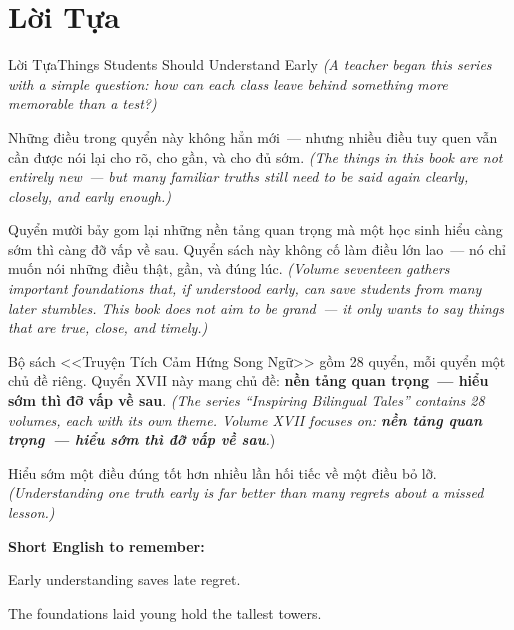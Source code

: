 \chapter*{Lời Tựa}

\begin{truyen}{Lời Tựa}{Things Students Should Understand Early}
\textit{(A teacher began this series with a simple question: how can each class leave behind something more memorable than a test?)}

Những điều trong quyển này không hẳn mới~--- nhưng nhiều điều tuy quen vẫn cần được nói lại cho rõ, cho gần, và cho đủ sớm.
\textit{(The things in this book are not entirely new~--- but many familiar truths still need to be said again clearly, closely, and early enough.)}

Quyển mười bảy gom lại những nền tảng quan trọng mà một học sinh hiểu càng sớm thì càng đỡ vấp về sau. Quyển sách này không cố làm điều lớn lao~--- nó chỉ muốn nói những điều thật, gần, và đúng lúc.
\textit{(Volume seventeen gathers important foundations that, if understood early, can save students from many later stumbles. This book does not aim to be grand~--- it only wants to say things that are true, close, and timely.)}

Bộ sách <<Truyện Tích Cảm Hứng Song Ngữ>> gồm 28 quyển, mỗi quyển một chủ đề riêng. Quyển XVII này mang chủ đề: \textbf{nền tảng quan trọng~--- hiểu sớm thì đỡ vấp về sau}.
\textit{(The series ``Inspiring Bilingual Tales'' contains 28 volumes, each with its own theme. Volume XVII focuses on: \textbf{nền tảng quan trọng~--- hiểu sớm thì đỡ vấp về sau}.})
\end{truyen}

\begin{baihoc}
Hiểu sớm một điều đúng tốt hơn nhiều lần hối tiếc về một điều bỏ lỡ.
\textit{(Understanding one truth early is far better than many regrets about a missed lesson.)}
\end{baihoc}

\begin{ghinhoanh}
\textbf{Short English to remember:}

Early understanding saves late regret.

The foundations laid young hold the tallest towers.
\end{ghinhoanh}

